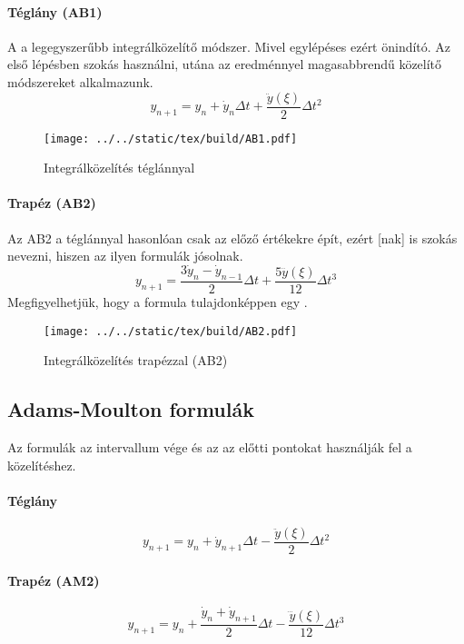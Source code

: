 \documentclass[../../main.tex]{subfiles}
\begin{document}
\paragraph{Téglány (AB1)}

A  a legegyszerűbb integrálközelítő módszer. Mivel egylépéses ezért
önindító. Az első lépésben szokás használni, utána az eredménnyel magasabbrendű
közelítő módszereket alkalmazunk.
\[
  y_{n + 1}
  = y_n + \dot y_n \Delta t
  + \frac{\ddot y(\xi)}{2} \Delta t^2
\]
\begin{figure}[H]
  \centering
  \texttt{[image: ../../static/tex/build/AB1.pdf]}
  \caption{Integrálközelítés téglánnyal}
  \label{fig:AB1}
\end{figure}

\paragraph{Trapéz (AB2)}

Az AB2  a téglánnyal hasonlóan csak az előző értékekre épít,
ezért [nak] is szokás nevezni, hiszen az ilyen formulák jósolnak.
\[
  y_{n+1}
  = \frac{3 \dot y_n - \dot y_{n-1}}{2} \Delta t
  + \frac{5 \dddot y(\xi)}{12} \Delta t^3
\]
Megfigyelhetjük, hogy a formula tulajdonképpen egy .

\begin{figure}[H]
  \centering
  \texttt{[image: ../../static/tex/build/AB2.pdf]}
  \caption{Integrálközelítés trapézzal (AB2)}
  \label{fig:AB2}
\end{figure}

\subsection{Adams-Moulton formulák}

Az  formulák az intervallum vége és az az előtti pontokat
használják fel a közelítéshez.

\paragraph{Téglány}
\[
  y_{n + 1}
  = y_n
  + \dot y_{n + 1} \Delta t
  - \frac{\ddot y(\xi)}{2} \Delta t^2
\]

\paragraph{Trapéz (AM2)}
\[
  y_{n + 1}
  = y_n
  + \frac{\dot y_n + \dot y_{n + 1}}{2} \Delta t
  - \frac{\dddot y(\xi)}{12} \Delta t^3
\]
\end{document}
